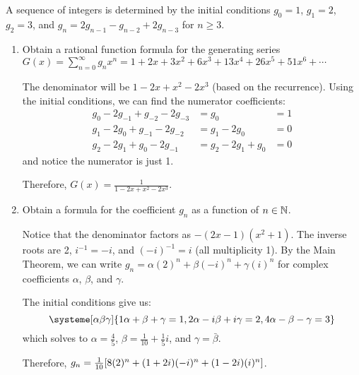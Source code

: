\begin{xca}
  A sequence of integers is determined by the initial conditions
  $g_0 = 1$, $g_1 = 2$, $g_2 = 3$, and $g_n = 2g_{n-1} - g_{n-2} + 2g_{n-3}$ for $n \geq 3$.
\end{xca}
\begin{enumerate}
  \item Obtain a rational function formula for the generating series
        $G(x) = \sum_{n=0}^\infty g_n x^n = 1 + 2x + 3x^2 + 6x^3 + 13x^4 + 26x^5 + 51x^6 + \dotsb$
        \begin{sol}
          The denominator will be $1 - 2x + x^2 - 2x^3$ (based on the recurrence).
          Using the initial conditions, we can find the numerator coefficients:
          \begin{align*}
            g_0 - 2g_{-1} + g_{-2} - 2g_{-3} & = g_0              & = 1 \\
            g_1 - 2g_{0} + g_{-1} - 2g_{-2}  & = g_1 - 2g_0       & = 0 \\
            g_2 - 2g_{1} + g_{0} - 2g_{-1}   & = g_2 - 2g_1 + g_0 & = 0
          \end{align*}
          and notice the numerator is just 1.

          Therefore, $G(x) = \frac{1}{1-2x+x^2-2x^3}$.
        \end{sol}
  \item Obtain a formula for the coefficient $g_n$ as a function of $n \in \mathbb{N}$.
        \begin{sol}
          Notice that the denominator factors as $-(2x-1)(x^2+1)$.
          The inverse roots are 2, $i^{-1} = -i$, and $(-i)^{-1} = i$ (all multiplicity 1).
          By the Main Theorem, we can write $g_n = \alpha(2)^n + \beta(-i)^n + \gamma(i)^n$
          for complex coefficients $\alpha$, $\beta$, and $\gamma$.

          The initial conditions give us:
          \[
            \systeme[\alpha\beta\gamma]{
              1\alpha + \beta + \gamma = 1,
              2\alpha - i\beta + i\gamma = 2,
              4\alpha - \beta - \gamma = 3
            }
          \]
          which solves to $\alpha = \frac45$, $\beta = \frac{1}{10} + \frac{1}{5}i$,
          and $\gamma = \bar\beta$.

          Therefore, $g_n = \frac{1}{10}\qty[8(2)^n + (1+2i)(-i)^n + (1-2i)(i)^n]$.
        \end{sol}
\end{enumerate}

